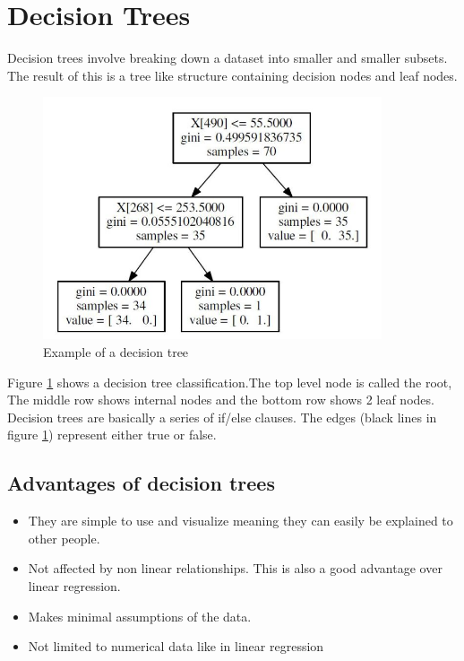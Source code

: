 \section{Decision Trees}

Decision trees involve breaking down a dataset into smaller and smaller subsets. The result of this is a tree like structure containing decision nodes and leaf nodes.

\begin{figure}[H]
  \centering
  \includegraphics[scale=0.5,width=100mm]{./images/decision-tree-example.jpg}
  \caption{Example of a decision tree}
  \label{fig:abalone-decision-tree}
\end{figure}

Figure \ref{fig:abalone-decision-tree} \cite{decisionTreeExample} shows a decision tree classification.The top level node is called the root, The middle row shows internal nodes and the bottom row shows 2 leaf nodes. Decision trees are basically a series of if/else clauses. The edges (black lines in figure \ref{fig:abalone-decision-tree}) represent either true or false.

\subsection{Advantages of decision trees}

\begin{itemize}
  \item They are simple to use and visualize meaning they can easily be explained to other people.
  \item Not affected by non linear relationships. This is also a good advantage over linear regression.
  \item Makes minimal assumptions of the data.
  \item Not limited to numerical data like in linear regression
\end{itemize}

